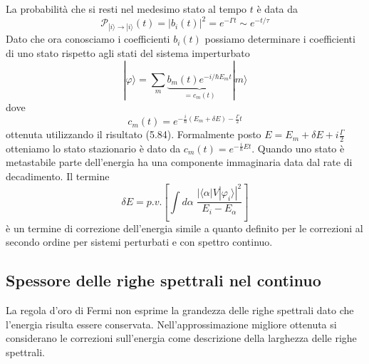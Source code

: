 La probabilit\`a che si resti nel medesimo stato al tempo $t$ \`e data da 
\begin{equation*}
	\mathcal{P}_{|i \rangle \to |i \rangle }(t) = |b_i(t)|^2 = e^{- \Gamma t} \sim e^{-t/\tau}
\end{equation*}
Dato che ora conosciamo i coefficienti $b_i(t)$ possiamo determinare i coefficienti di uno stato rispetto agli stati del sistema imperturbato
\begin{equation*}
	|\varphi \rangle = \sum_{m} \underbrace{b_m(t)e^{-i/\hbar E_mt}}_{=c_m(t)}|m \rangle 
\end{equation*}
dove 
\begin{equation*}
	c_m(t) = e^{-\frac{i}{\hbar} (E_m+\delta E)- \frac{\Gamma}{2}t}
\end{equation*}
ottenuta utilizzando il risultato (5.84). Formalmente posto $E = E_m + \delta E + i \frac{\Gamma}{2}$ otteniamo lo stato stazionario \`e dato da $c_m(t) = e^{-\frac{i}{\hbar}E t}$. Quando uno stato \`e metastabile parte dell'energia ha una componente immaginaria data dal rate di decadimento. Il termine 
\begin{equation*}
	\delta E = p.v. \left[\int d\alpha \; \frac{|\langle \alpha |V|\varphi_i \rangle|^2}{E_i - E_{\alpha}}\right] 
\end{equation*}
\`e un termine di correzione dell'energia simile a quanto definito per le correzioni al secondo ordine per sistemi perturbati e con spettro continuo.
\newpage

\subsection{Spessore delle righe spettrali nel continuo}

La regola d'oro di Fermi non esprime la grandezza delle righe spettrali dato che l'energia risulta essere conservata. Nell'approssimazione migliore ottenuta si considerano le correzioni sull'energia come descrizione della larghezza delle righe spettrali. 

